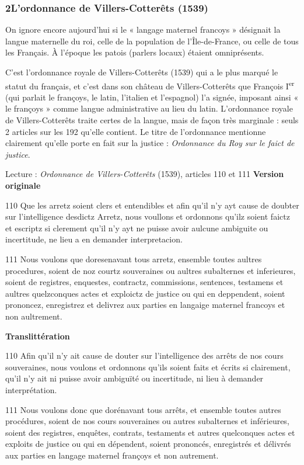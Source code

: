 \subsubsection*{2\quad L’ordonnance de Villers-Cotterêts (1539)}
On ignore encore aujourd’hui si le « langage maternel francoys » désignait la langue maternelle du roi, celle de la population de l’Île-de-France, ou celle de tous les Français. À l’époque les patois (parlers locaux) étaient omniprésents.

C’est l’ordonnance royale de Villers-Cotterêts (1539) qui a le plus marqué le statut du français, et c’est dans son château de Villers-Cotterêts que François I\textsuperscript{er} (qui parlait le françoys, le latin, l’italien et l’espagnol) l’a signée, imposant ainsi « le françoys » comme langue administrative au lieu du latin. L’ordonnance royale de Villers-Cotterêts traite certes de la langue, mais de façon très marginale : seuls 2 articles sur les 192 qu’elle contient. Le titre de l’ordonnance mentionne clairement qu’elle porte en fait sur la justice : \textit{Ordonnance du Roy sur le faict de justice}.
\begin{lecture}{Lecture : \textit{Ordonnance de Villers-Cotterêts} (1539), articles 110 et 111}
\textnormal{\textbf{Version originale}}\par
110 Que les arretz soient clers et entendibles et afin qu’il n’y ayt cause de doubter sur l’intelligence desdictz Arretz, nous voullons et ordonnons qu’ilz soient faictz et escriptz si clerement qu’il n’y ayt ne puisse avoir aulcune ambiguite ou incertitude, ne lieu a en demander interpretacion.

111 Nous voulons que doresenavant tous arretz, ensemble toutes aultres procedures, soient de noz courtz souveraines ou aultres subalternes et inferieures, soient de registres, enquestes, contractz, commissions, sentences, testamens et aultres quelzconques actes et exploictz de justice ou qui en deppendent, soient prononcez, enregistrez et delivrez aux parties en langaige maternel francoys et non aultrement.

\textnormal{\textbf{Translittération}}\par
110 Afin qu’il n’y ait cause de douter sur l’intelligence des arrêts de nos cours souveraines, nous voulons et ordonnons qu’ils soient faits et écrits si clairement, qu’il n’y ait ni puisse avoir ambiguïté ou incertitude, ni lieu à demander interprétation.

111 Nous voulons donc que dorénavant tous arrêts, et ensemble toutes autres procédures, soient de nos cours souveraines ou autres subalternes et inférieures, soient des registres, enquêtes, contrats, testaments et autres quelconques actes et exploits de justice ou qui en dépendent, soient prononcés, enregistrés et délivrés aux parties en langage maternel françoys et non autrement.
\end{lecture}
